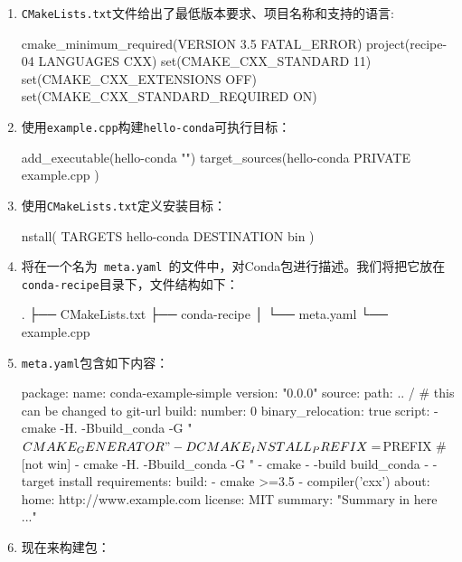 \begin{enumerate}
\item \texttt{CMakeLists.txt}文件给出了最低版本要求、项目名称和支持的语言:

\begin{codebox}[cmake]
cmake_minimum_required(VERSION 3.5 FATAL_ERROR)
project(recipe-04 LANGUAGES CXX)
set(CMAKE_CXX_STANDARD 11)
set(CMAKE_CXX_EXTENSIONS OFF)
set(CMAKE_CXX_STANDARD_REQUIRED ON)
\end{codebox}

\item 使用\texttt{example.cpp}构建\texttt{hello-conda}可执行目标：

\begin{codebox}[cmake]
add_executable(hello-conda "")
target_sources(hello-conda
  PRIVATE
    example.cpp
  )
\end{codebox}

\item 使用\texttt{CMakeLists.txt}定义安装目标：

\begin{codebox}[cmake]
nstall(
  TARGETS
    hello-conda
  DESTINATION
    bin
  )
\end{codebox}

\item 将在一个名为\texttt{ meta.yaml }的文件中，对Conda包进行描述。我们将把它放在\texttt{conda-recipe}目录下，文件结构如下：

\begin{codebox}[shell]
.
├── CMakeLists.txt
├── conda-recipe
│    └── meta.yaml
└── example.cpp
\end{codebox}

\item \texttt{meta.yaml}包含如下内容：

\begin{codebox}[yaml]
package:
  name: conda-example-simple
  version: "0.0.0"
source:
  path: .. /  # this can be changed to git-url
build:
  number: 0
  binary_relocation: true
  script:
    - cmake -H. -Bbuild_conda -G "${CMAKE_GENERATOR}" -DCMAKE_INSTALL_PREFIX=${PREFIX} # [not win]
    - cmake -H. -Bbuild_conda -G "%
    - cmake - -build build_conda - -target install
requirements:
  build:
    - cmake >=3.5
    - { { compiler('cxx') } }
about:
  home: http://www.example.com
  license: MIT
  summary: "Summary in here ..."
\end{codebox}

\item 现在来构建包：


\end{enumerate}
